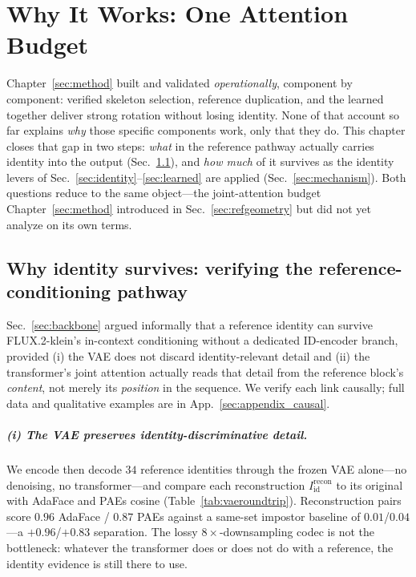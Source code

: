 \chapter{Why It Works: One Attention Budget}
\label{sec:whyworks}
Chapter~\ref{sec:method} built and validated \method{} \emph{operationally},
component by component: verified skeleton selection, reference duplication,
and the learned \gate{} together deliver strong rotation without losing
identity. None of that account so far explains \emph{why} those specific
components work, only that they do. This chapter closes that gap in two
steps: \emph{what} in the reference pathway actually carries identity into
the output (Sec.~\ref{sec:refverify}), and \emph{how much} of it survives as
the identity levers of Sec.~\ref{sec:identity}--\ref{sec:learned} are applied
(Sec.~\ref{sec:mechanism}). Both questions reduce to the same object---the
joint-attention budget Chapter~\ref{sec:method} introduced in
Sec.~\ref{sec:refgeometry} but did not yet analyze on its own terms.

\section{Why identity survives: verifying the reference-conditioning pathway}
\label{sec:refverify}
Sec.~\ref{sec:backbone} argued informally that a reference identity can survive
FLUX.2-klein's in-context conditioning without a dedicated ID-encoder branch,
provided (i) the VAE does not discard identity-relevant detail and (ii) the
transformer's joint attention actually reads that detail from the reference
block's \emph{content}, not merely its \emph{position} in the sequence. We
verify each link causally; full data and qualitative examples are in
App.~\ref{sec:appendix_causal}.

\paragraph{(i) The VAE preserves identity-discriminative detail.} We encode
then decode $34$ reference identities through the frozen VAE alone---no
denoising, no transformer---and compare each reconstruction
$I_{\mathrm{id}}^{\mathrm{recon}}$ to its original with AdaFace and PAEs
cosine (Table~\ref{tab:vaeroundtrip}). Reconstruction pairs score
$0.96$ AdaFace / $0.87$ PAEs against a same-set impostor baseline of
$0.01$/$0.04$---a $+0.96$/$+0.83$ separation. The lossy $8\times$-downsampling
codec is not the bottleneck: whatever the transformer does or does not do with
a reference, the identity evidence is still there to use.

